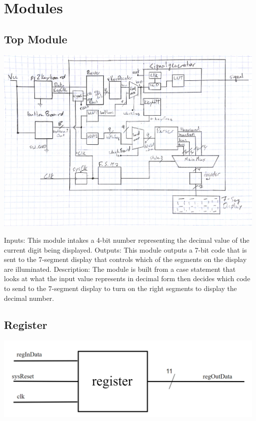 \documentclass[a4paper]{article}
\begin{document}
\section{Modules}

\subsection{Top Module}

    \includegraphics[width=5.5 in]{Images/topLevelSchematic.jpg}


Inputs: This module intakes a 4-bit number representing the decimal value of the current digit being displayed.
\newline\newline
Outputs: This module outputs a 7-bit code that is sent to the 7-segment display that controls which of the segments on the display are illuminated.
\newline\newline
Description: The module is built from a case statement that looks at what the input value represents in decimal form then decides which code to send to the 7-segment display to turn on the right segments to display the decimal number.


\subsection{Register}

    \includegraphics[width=6 in]{./Images/DiagramsYang/register.png}
\end{document}
